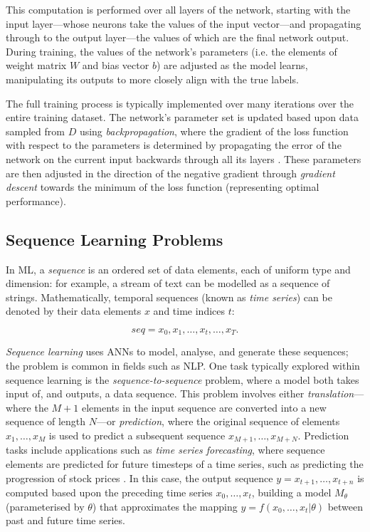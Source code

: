 \documentclass[a4paper, 11pt]{report}
\begin{document}
    This computation is performed over all layers of the network, starting with the input layer---whose neurons take the values of the input vector---and propagating through to the output layer—the values of which are the final network output. During training, the values of the network's parameters (i.e. the elements of weight matrix $W$ and bias vector $b$) are adjusted as the model learns, manipulating its outputs to more closely align with the true labels. 
    
    The full training process is typically implemented over many iterations over the entire training dataset. The network's parameter set is updated based upon data sampled from $D$ using \emph{backpropagation}, where the gradient of the loss function with respect to the parameters is determined by propagating the error of the network on the current input backwards through all its layers \citep{zaras-2022}. These parameters are then adjusted in the direction of the negative gradient through \emph{gradient descent} towards the minimum of the loss function (representing optimal performance).


    \subsection{Sequence Learning Problems}

    In ML, a \emph{sequence} is an ordered set of data elements, each of uniform type and dimension: for example, a stream of text can be modelled as a sequence of strings. Mathematically, temporal sequences (known as \emph{time series}) can be denoted by their data elements $x$ and time indices $t$:

    \begin{equation}
        \label{eq: timeseries}
        seq = x_0, x_1, \ldots, x_t, \ldots, x_T
        \text{.}
    \end{equation}

    \emph{Sequence learning} uses ANNs to model, analyse, and generate these sequences; the problem is common in fields such as NLP. One task typically explored within sequence learning is the \emph{sequence-to-sequence} problem, where a model both takes input of, and outputs, a data sequence. This problem involves either \emph{translation}---where the $M+1$ elements in the input sequence are converted into a new sequence of length $N$---or \emph{prediction}, where the original sequence of elements $x_1, \ldots, x_M$ is used to predict a subsequent sequence $x_{M+1}, \ldots, x_{M+N}$. Prediction tasks include applications such as \emph{time series forecasting}, where sequence elements are predicted for future timesteps of a time series, such as predicting the progression of stock prices \citep{darapaneni-2022}. In this case, the output sequence $y = x_{t+1}, \ldots, x_{t+n}$ is computed based upon the preceding time series $x_0, \ldots, x_t$, building a model $M_{\theta}$ (parameterised by $\theta$) that approximates the mapping $y = f ( x_0, \ldots, x_t \lvert \theta )$ between past and future time series.
\end{document}
